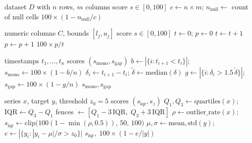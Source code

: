 \documentclass[conference]{IEEEtran}
\begin{document}
\begin{algorithm}[!t]
\caption{CompletenessScore}
\label{alg:complete}
\begin{algorithmic}[1]
\REQUIRE dataset $D$ with $n$ rows, $m$ columns
\ENSURE score $s \in [0,100]$
\STATE $c \gets n \times m$; $n_{\text{null}} \gets$ count of null cells
\RETURN $100 \times (1 - n_{\text{null}}/c)$
\end{algorithmic}
\end{algorithm}

\begin{algorithm}[!t]
\caption{SemanticBoundsScore}
\label{alg:bounds}
\begin{algorithmic}[1]
\REQUIRE numeric columns $C$, bounds $[l_j,u_j]$
\ENSURE score $s \in [0,100]$
\STATE $t \gets 0$; $p \gets 0$
  \STATE $t \gets t+1$
    \STATE $p \gets p+1$
  \ENDIF
\ENDFOR
\RETURN $100 \times p/t$
\end{algorithmic}
\end{algorithm}

\begin{algorithm}[!t]
\caption{TemporalConsistencyScore}
\label{alg:temporal}
\begin{algorithmic}[1]
\REQUIRE timestamps $t_1,\ldots,t_n$
\ENSURE scores $(s_{\text{mono}}, s_{\text{gap}})$
\STATE $b \gets |\{i : t_{i+1} < t_i\}|$; \quad $s_{\text{mono}} \gets 100 \times (1 - b/n)$
\STATE $\delta_i \gets t_{i+1}-t_i$; \STATE $\tilde{\delta} \gets \mathrm{median}(\delta)$
\STATE $g \gets |\{i : \delta_i > 1.5\,\tilde{\delta}\}|$; \quad $s_{\text{gap}} \gets 100 \times (1 - g/n)$
\RETURN $s_{\text{mono}}, s_{\text{gap}}$
\end{algorithmic}
\end{algorithm}

\begin{algorithm}[!t]
\caption{OutlierScores (IQR + z-score)}
\label{alg:outlier}
\begin{algorithmic}[1]
\REQUIRE series $x$, target $y$, threshold $z_0=5$
\ENSURE scores $(s_{\text{iqr}}, s_z)$
\STATE $Q_1,Q_3 \gets \mathrm{quartiles}(x)$; \STATE $\mathrm{IQR} \gets Q_3-Q_1$
\STATE fences $\gets [Q_1-3\,\mathrm{IQR},\; Q_3+3\,\mathrm{IQR}]$ 
\STATE $\rho \gets \mathrm{outlier\_rate}(x)$; \quad $s_{\text{iqr}} \gets \mathrm{clip}\big(100(1-\min(\rho,0.5)),\,50,\,100\big)$
\STATE $\mu,\sigma \gets \mathrm{mean,std}(y)$; \quad $e \gets |\{y_i : |y_i-\mu|/\sigma > z_0\}|$
\RETURN $s_{\text{iqr}},\; 100 \times (1 - e/|y|)$
\end{algorithmic}
\end{algorithm}
\end{document}
